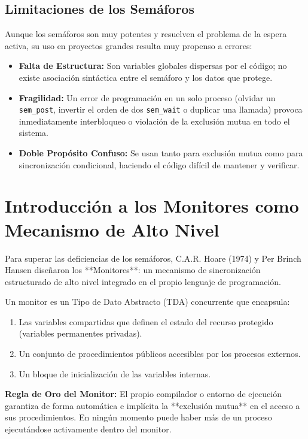 \subsection{Limitaciones de los Semáforos}
Aunque los semáforos son muy potentes y resuelven el problema de la espera activa, su uso en proyectos grandes resulta muy propenso a errores:
\begin{itemize}
    \item \textbf{Falta de Estructura:} Son variables globales dispersas por el código; no existe asociación sintáctica entre el semáforo y los datos que protege.
    \item \textbf{Fragilidad:} Un error de programación en un solo proceso (olvidar un \texttt{sem\_post}, invertir el orden de dos \texttt{sem\_wait} o duplicar una llamada) provoca inmediatamente interbloqueo o violación de la exclusión mutua en todo el sistema.
    \item \textbf{Doble Propósito Confuso:} Se usan tanto para exclusión mutua como para sincronización condicional, haciendo el código difícil de mantener y verificar.
\end{itemize}

\section{Introducción a los Monitores como Mecanismo de Alto Nivel}

Para superar las deficiencias de los semáforos, C.A.R. Hoare (1974) y Per Brinch Hansen diseñaron los **Monitores**: un mecanismo de sincronización estructurado de alto nivel integrado en el propio lenguaje de programación.

\begin{definicion}[Monitor]
Un monitor es un Tipo de Dato Abstracto (TDA) concurrente que encapsula:
\begin{enumerate}
    \item Las variables compartidas que definen el estado del recurso protegido (variables permanentes privadas).
    \item Un conjunto de procedimientos públicos accesibles por los procesos externos.
    \item Un bloque de inicialización de las variables internas.
\end{enumerate}
\textbf{Regla de Oro del Monitor:} El propio compilador o entorno de ejecución garantiza de forma automática e implícita la **exclusión mutua** en el acceso a sus procedimientos. En ningún momento puede haber más de un proceso ejecutándose activamente dentro del monitor.
\end{definicion}

